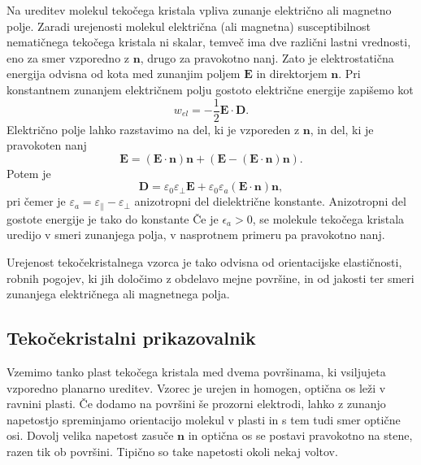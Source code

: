 Na ureditev molekul tekočega kristala vpliva zunanje električno ali magnetno polje.
Zaradi urejenosti molekul električna (ali magnetna) susceptibilnost nematičnega tekočega
kristala ni skalar, temveč ima dve različni lastni vrednosti,
eno za smer vzporedno z $\mathbf{n}$, drugo za pravokotno nanj. Zato je
elektrostatična energija odvisna od kota med zunanjim poljem $\mathbf{E}$
in direktorjem $\mathbf{n}$. Pri konstantnem zunanjem električnem polju 
gostoto električne energije zapišemo kot 
\begin{equation}
w_{el}=-\frac{1}{2}\mathbf{E}\cdot \mathbf{D}.
\label{lcwe}
\end{equation}
Električno polje lahko razstavimo na del, ki je vzporeden z $\mathbf{n}$, in del, ki je
pravokoten nanj
\begin{equation}
\mathbf{E} = (\mathbf{E} \cdot \mathbf{n}) \mathbf{n} + \left( \mathbf{E} - 
(\mathbf{E} \cdot \mathbf{n}) \mathbf{n} \right).
\end{equation}
Potem je 
\begin{equation}
\mathbf{D} = \varepsilon_0 \varepsilon_\bot \mathbf{E} + \varepsilon_0 \varepsilon_a
(\mathbf{E}\cdot\mathbf{n})\mathbf{n},
\label{7.56a}
\end{equation}
pri čemer je $\varepsilon_a = \varepsilon_\parallel - \varepsilon_\bot$ anizotropni
del dielektrične konstante. Anizotropni del gostote energije je tako do konstante
Če je $\epsilon_{a}>0$, se molekule tekočega kristala uredijo v smeri 
zunanjega polja, v nasprotnem primeru pa pravokotno nanj.

Urejenost tekočekristalnega vzorca je tako odvisna od orientacijske
elastičnosti, robnih pogojev, ki jih določimo z obdelavo mejne
površine, in od jakosti ter smeri zunanjega električnega ali magnetnega polja.

\subsection*{Tekočekristalni prikazovalnik}
Vzemimo tanko plast tekočega kristala med dvema površinama, ki vsiljujeta
vzporedno planarno ureditev. Vzorec je urejen in homogen, optična os leži v ravnini 
plasti. Če dodamo na površini še prozorni elektrodi, lahko
z zunanjo napetostjo spreminjamo orientacijo molekul v plasti in s tem tudi 
smer optične osi. Dovolj velika napetost zasuče $\mathbf{n}$ in optična os
se postavi pravokotno na stene, razen tik ob površini. Tipično so take napetosti okoli 
nekaj voltov.

